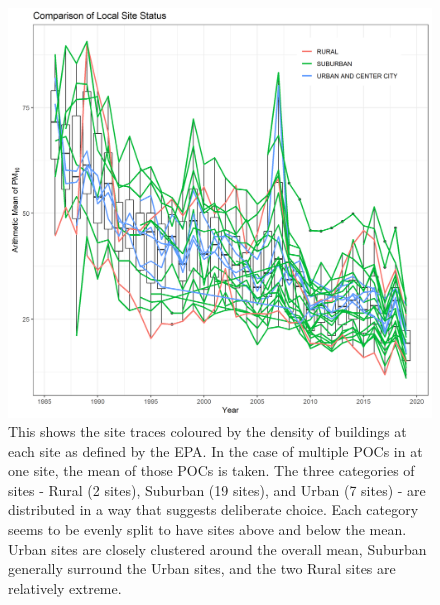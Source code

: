 \documentclass{article}
\begin{document}
\begin{figure}[ht]
	\centering
	\includegraphics[width = \textwidth]{Figures/SOCAB_metadata_Site_Status.png}
	\caption{This shows the site traces coloured by the density of buildings at each site as defined by the EPA.  In the case of multiple \ac{POC}s in at one site, the mean of those \ac{POC}s is taken.  The three categories of sites - Rural (2 sites), Suburban (19 sites), and Urban (7 sites) - are distributed in a way that suggests deliberate choice. Each category seems to be evenly split to have sites above and below the mean.  Urban sites are closely clustered around the overall mean, Suburban generally surround the Urban sites, and the two Rural sites are relatively extreme.  }
	\label{fig:SOCAB_metadata_Site_Status}
\end{figure}
\end{document}
